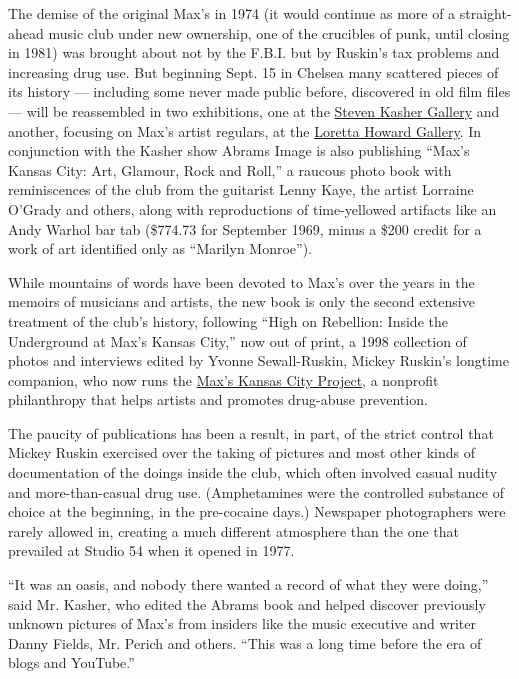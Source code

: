 The demise of the original Max's in 1974 (it would continue as more of a
straight-ahead music club under new ownership, one of the crucibles of
punk, until closing in 1981) was brought about not by the F.B.I. but by
Ruskin's tax problems and increasing drug use. But beginning Sept. 15 in
Chelsea many scattered pieces of its history --- including some never
made public before, discovered in old film files --- will be reassembled
in two exhibitions, one at the
\href{http://www.stevenkasher.com/html/home.asp}{Steven Kasher Gallery}
and another, focusing on Max's artist regulars, at the
\href{http://www.lorettahoward.com/}{Loretta Howard Gallery}. In
conjunction with the Kasher show Abrams Image is also publishing ``Max's
Kansas City: Art, Glamour, Rock and Roll,'' a raucous photo book with
reminiscences of the club from the guitarist Lenny Kaye, the artist
Lorraine O'Grady and others, along with reproductions of time-yellowed
artifacts like an Andy Warhol bar tab (\$774.73 for September 1969,
minus a \$200 credit for a work of art identified only as ``Marilyn
Monroe'').

While mountains of words have been devoted to Max's over the years in
the memoirs of musicians and artists, the new book is only the second
extensive treatment of the club's history, following ``High on
Rebellion: Inside the Underground at Max's Kansas City,'' now out of
print, a 1998 collection of photos and interviews edited by Yvonne
Sewall-Ruskin, Mickey Ruskin's longtime companion, who now runs the
\href{http://www.maxskansascity.org/}{Max's Kansas City Project}, a
nonprofit philanthropy that helps artists and promotes drug-abuse
prevention.

The paucity of publications has been a result, in part, of the strict
control that Mickey Ruskin exercised over the taking of pictures and
most other kinds of documentation of the doings inside the club, which
often involved casual nudity and more-than-casual drug use.
(Amphetamines were the controlled substance of choice at the beginning,
in the pre-cocaine days.) Newspaper photographers were rarely allowed
in, creating a much different atmosphere than the one that prevailed at
Studio 54 when it opened in 1977.

``It was an oasis, and nobody there wanted a record of what they were
doing,'' said Mr. Kasher, who edited the Abrams book and helped discover
previously unknown pictures of Max's from insiders like the music
executive and writer Danny Fields, Mr. Perich and others. ``This was a
long time before the era of blogs and YouTube.''

